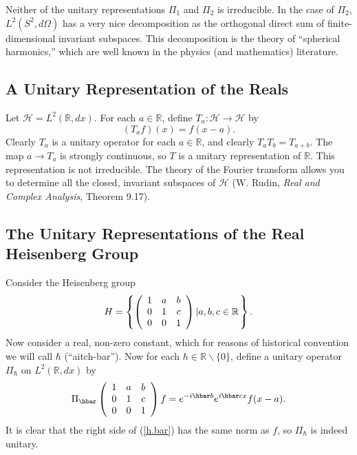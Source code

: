 \documentclass{amsbook}
\theoremstyle{plain}
\numberwithin{equation}{chapter}
\numberwithin{theorem}{chapter}
\begin{document}
Neither of the unitary representations $\Pi_{1}$ and $\Pi_{2}$ is irreducible.
In the case of $\Pi_{2}$, $L^{2}(S^{2},d\Omega)$ has a very nice decomposition
as the orthogonal direct sum of finite-dimensional invariant subspaces. This
decomposition is the theory of ``spherical harmonics,'' which are well known
in the physics (and mathematics) literature.

\subsection{A Unitary Representation of the Reals}

Let $\mathcal{H}=L^{2}(\mathbb{R},dx)$. For each $a\in\mathbb{R}$, define
$T_{a}:\mathcal{H}\rightarrow\mathcal{H}$ by
\[
\left(  T_{a}f\right)  (x)=f(x-a)\text{.}%
\]
Clearly $T_{a}$ is a unitary operator for each $a\in\mathbb{R}$, and clearly
$T_{a}T_{b}=T_{a+b}$. The map $a\rightarrow T_{a}$ is strongly continuous, so
$T$ is a unitary representation of $\mathbb{R}$. This representation is not
irreducible. The theory of the Fourier transform allows you to determine all
the closed, invariant subspaces of $\mathcal{H}$ (W. Rudin, \textit{Real and
Complex Analysis}, Theorem 9.17).

\subsection{The Unitary Representations of the Real Heisenberg Group}

Consider the Heisenberg group
\[
H=\left\{  \left(
\begin{array}
[c]{ccc}%
1 & a & b\\
0 & 1 & c\\
0 & 0 & 1
\end{array}
\right)  \left|  a,b,c\in\mathbb{R}\right.  \right\}  \text{.}%
\]
Now consider a real, non-zero constant, which for reasons of historical
convention we will call $\hbar$ (``aitch-bar''). Now for each $\hbar
\in\mathbb{R}\backslash\{0\}$, define a unitary operator $\Pi_{\hbar}$ on
$L^{2}(\mathbb{R},dx)$ by
\begin{equation}
\Pi_{\hbar}\left(
\begin{array}
[c]{ccc}%
1 & a & b\\
0 & 1 & c\\
0 & 0 & 1
\end{array}
\right)  f=e^{-i\hbar b}e^{i\hbar cx}f(x-a)\text{.}\label{h.bar}%
\end{equation}
It is clear that the right side of (\ref{h.bar}) has the same norm as $f$, so
$\Pi_{\hbar}$ is indeed unitary.
\end{document}
